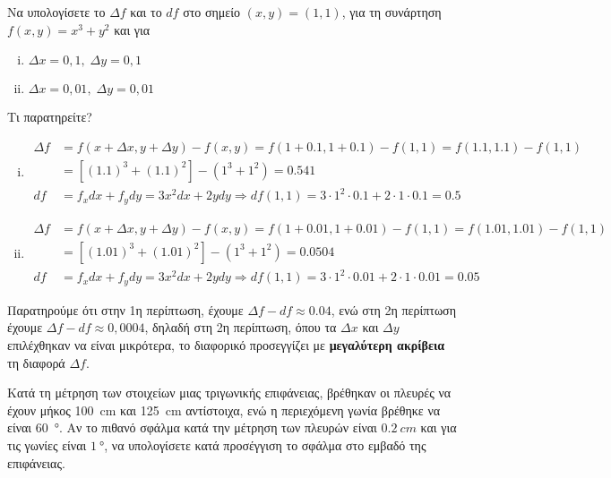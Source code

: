 \documentclass[a4paper,table]{report}
\begin{document}
\begin{example}
  Να υπολογίσετε το $ \Delta f $ και το $ df $ στο σημείο $ (x,y) = (1,1) $, 
  για τη συνάρτηση $ f(x,y) = x^{3}+y^{2} $ και για 
  \begin{enumerate}[i)]
    \item $ \Delta x = 0,1, \; \Delta y = 0,1 $
    \item $ \Delta x = 0,01, \; \Delta y = 0,01 $
  \end{enumerate}
  Τι παρατηρείτε?
\end{example}
\begin{solution}
\item {}
  \begin{enumerate}[i)]
    \item 
      \begin{align*} 
        \Delta f &= f(x+ \Delta x, y + \Delta y) - f(x,y) = f(1+0.1,1+0.1) - 
        f(1,1) = f(1.1,1.1) - f(1,1) \\ 
                 &= [(1.1)^{3}+(1.1)^{2}] - (1^{3}+1^{2}) = 0.541 \\
        df &= f_{x}dx + f_{y}dy  = 3x^{2} dx + 2y dy \Rightarrow df (1,1) = 
        3\cdot 1^{2} \cdot 0.1 + 2 \cdot 1 \cdot 0.1 = 0.5 
      \end{align*}
    \item 
      \begin{align*} 
        \Delta f &= f(x+ \Delta x, y + \Delta y) - f(x,y) = f(1+0.01,1+0.01) - 
        f(1,1) = f(1.01,1.01) - f(1,1) \\ 
                 &= [(1.01)^{3}+(1.01)^{2}] - (1^{3}+1^{2}) = 0.0504 \\
        df &= f_{x}dx + f_{y}dy  = 3x^{2} dx + 2y dy \Rightarrow df (1,1) = 
        3\cdot 1^{2} \cdot 0.01 + 2 \cdot 1 \cdot 0.01 = 0.05 
      \end{align*}
  \end{enumerate}
  Παρατηρούμε ότι στην 1η περίπτωση, έχουμε
  $ \Delta f - df \approx 0.04 $, ενώ στη 2η περίπτωση έχουμε $ \Delta f - df \approx 
  0,0004 $, δηλαδή στη 2η περίπτωση, όπου τα $ \Delta x $ και $ \Delta y $ επιλέχθηκαν 
  να είναι μικρότερα, το διαφορικό προσεγγίζει με \textbf{μεγαλύτερη ακρίβεια} τη 
  διαφορά $ \Delta f $.
\end{solution}

\begin{example}
  Κατά τη μέτρηση των στοιχείων μιας τριγωνικής επιφάνειας, βρέθηκαν οι πλευρές να 
  έχουν μήκος \SI{100}{cm} και \SI{125}{cm} αντίστοιχα, ενώ η περιεχόμενη γωνία βρέθηκε 
  να είναι \SI{60}{\degree}. Αν το πιθανό σφάλμα κατά την μέτρηση των πλευρών είναι 
  $ \SI{0.2}{cm} $ και για τις γωνίες είναι $ \SI{1}{\degree} $, να υπολογίσετε κατά 
  προσέγγιση το σφάλμα στο εμβαδό της επιφάνειας.
\end{example}
\end{document}
